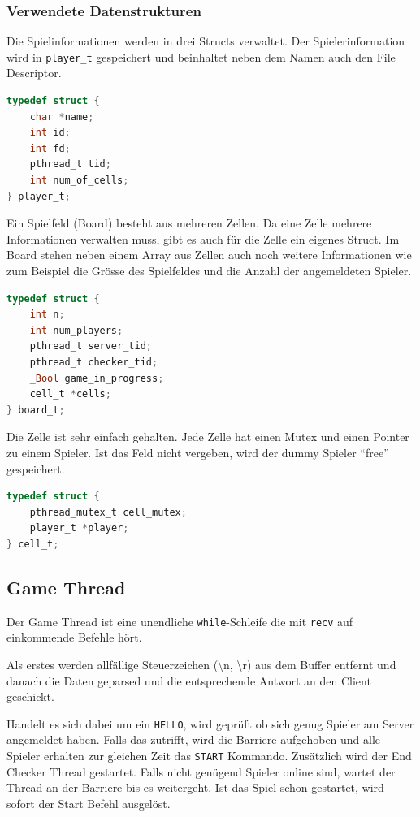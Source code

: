 \subsubsection{Verwendete Datenstrukturen}
Die Spielinformationen werden in drei Structs verwaltet. Der Spielerinformation wird in \texttt{player\_t} gespeichert und beinhaltet neben dem Namen auch den File Descriptor.

\begin{lstlisting}[language=C,caption={Player Struct}]
typedef struct {
    char *name;
    int id;
    int fd;
    pthread_t tid;
    int num_of_cells;
} player_t;
\end{lstlisting}

Ein Spielfeld (Board) besteht aus mehreren Zellen. Da eine Zelle mehrere Informationen verwalten muss, gibt es auch für die Zelle ein eigenes Struct. Im Board stehen neben einem Array aus Zellen auch noch weitere Informationen wie zum Beispiel die Grösse des Spielfeldes und die Anzahl der angemeldeten Spieler.

\begin{lstlisting}[language=c,caption={Board Struct}]
typedef struct {
    int n;
    int num_players;
    pthread_t server_tid;
    pthread_t checker_tid;
    _Bool game_in_progress;
    cell_t *cells;
} board_t;
\end{lstlisting}

Die Zelle ist sehr einfach gehalten. Jede Zelle hat einen Mutex und einen Pointer zu einem Spieler. Ist das Feld nicht vergeben, wird der dummy Spieler ``free'' gespeichert.

\begin{lstlisting}[language=c,caption={Cell Struct}]
typedef struct {
    pthread_mutex_t cell_mutex;
    player_t *player;
} cell_t;
\end{lstlisting}
 
\subsection{Game Thread}
Der Game Thread ist eine unendliche \texttt{while}-Schleife die mit \texttt{recv} auf einkommende Befehle hört.

Als erstes werden allfällige Steuerzeichen (\textbackslash n, \textbackslash r) aus dem Buffer entfernt und danach die Daten geparsed und die entsprechende Antwort an den Client geschickt.

Handelt es sich dabei um ein \texttt{HELLO}, wird geprüft ob sich genug Spieler am Server angemeldet haben. Falls das zutrifft, wird die Barriere aufgehoben und alle Spieler erhalten zur gleichen Zeit das \texttt{START} Kommando. Zusätzlich wird der End Checker Thread gestartet. Falls nicht genügend Spieler online sind, wartet der Thread an der Barriere bis es weitergeht. Ist das Spiel schon gestartet, wird sofort der Start Befehl ausgelöst.


